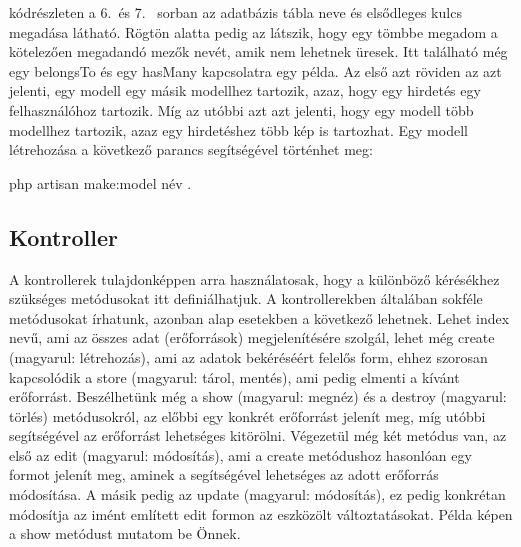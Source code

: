\documentclass[]{thesis-ekf}
\theoremstyle{definition}
\theoremstyle{remark}
\begin{document}
		
		
		 kódrészleten a 6.~és 7.~ sorban az adatbázis tábla neve és elsődleges kulcs megadása látható. Rögtön alatta pedig az látszik, hogy egy tömbbe megadom a kötelezően megadandó mezők nevét, amik nem lehetnek üresek. Itt található még egy belongsTo és egy hasMany kapcsolatra egy példa. Az első azt röviden az azt jelenti, egy modell egy másik modellhez tartozik, azaz, hogy egy hirdetés egy felhasználóhoz tartozik. Míg az utóbbi azt azt jelenti, hogy egy modell több modellhez tartozik, azaz egy hirdetéshez több kép is tartozhat. Egy modell létrehozása a következő parancs segítségével történhet meg:
		\begin{center} 
			php artisan make:model név .
		\end{center}
	
	\subsection{Kontroller}\label{sc-kontroller}
		A kontrollerek tulajdonképpen arra használatosak, hogy a különböző kérésékhez szükséges metódusokat itt definiálhatjuk. A kontrollerekben általában sokféle metódusokat írhatunk, azonban alap esetekben a következő lehetnek. Lehet index nevű, ami az összes adat (erőforrások) megjelenítésére szolgál, lehet még create (magyarul: létrehozás), ami az adatok bekéréséért felelős form, ehhez szorosan kapcsolódik a store (magyarul: tárol, mentés), ami pedig elmenti a kívánt erőforrást. Beszélhetünk még a show (magyarul: megnéz) és a destroy (magyarul: törlés) metódusokról, az előbbi egy konkrét erőforrást jelenít meg, míg utóbbi segítségével az erőforrást lehetséges kitörölni. Végezetül még két metódus van, az első az edit (magyarul: módosítás), ami a create metódushoz hasonlóan egy formot jelenít meg, aminek a segítségével lehetséges az adott erőforrás módosítása. A másik pedig az update (magyarul: módosítás), ez pedig konkrétan módosítja az imént említett edit formon az eszközölt változtatásokat. Példa képen a show metódust mutatom be Önnek. \cite{Laravel}
	
		
	
\end{document}
